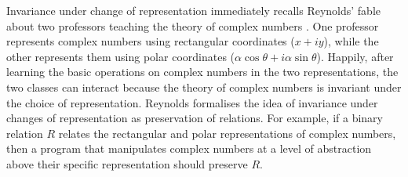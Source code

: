 Invariance under change of representation immediately recalls
Reynolds' fable about two professors teaching the theory of complex
numbers \cite{reynolds83types}. One professor represents complex
numbers using rectangular coordinates ($x + iy$), while the other
represents them using polar coordinates ($\alpha\cos\theta +
i\alpha\sin\theta$). Happily, after learning the basic operations on
complex numbers in the two representations, the two classes can
interact because the theory of complex numbers is invariant under the
choice of representation. Reynolds formalises the idea of invariance
under changes of representation as preservation of relations.  For
example, if a binary relation $R$ relates the rectangular and polar
representations of complex numbers, then a program that manipulates
complex numbers at a level of abstraction above their specific
representation should preserve $R$. %

